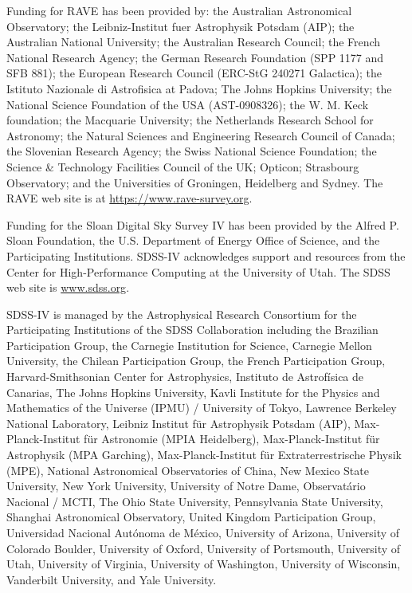 \documentclass[apj, twocolappendix, numberedappendix, appendixfloats]{emulateapj}
\begin{document}
Funding for RAVE has been provided by: the Australian Astronomical Observatory; the Leibniz-Institut fuer Astrophysik Potsdam (AIP); the Australian National University; the Australian Research Council; the French National Research Agency; the German Research Foundation (SPP 1177 and SFB 881); the European Research Council (ERC-StG 240271 Galactica); the Istituto Nazionale di Astrofisica at Padova; The Johns Hopkins University; the National Science Foundation of the USA (AST-0908326); the W. M. Keck foundation; the Macquarie University; the Netherlands Research School for Astronomy; the Natural Sciences and Engineering Research Council of Canada; the Slovenian Research Agency; the Swiss National Science Foundation; the Science \& Technology Facilities Council of the UK; Opticon; Strasbourg Observatory; and the Universities of Groningen, Heidelberg and Sydney.
The RAVE web site is at \url{https://www.rave-survey.org}.

Funding for the Sloan Digital Sky Survey IV has been provided by the Alfred P. Sloan Foundation, the U.S. Department of Energy Office of Science, and the Participating Institutions. SDSS-IV acknowledges support and resources from the Center for High-Performance Computing at the University of Utah. The SDSS web site is \url{www.sdss.org}.

SDSS-IV is managed by the Astrophysical Research Consortium for the Participating Institutions of the SDSS Collaboration including the Brazilian Participation Group, the Carnegie Institution for Science, Carnegie Mellon University, the Chilean Participation Group, the French Participation Group, Harvard-Smithsonian Center for Astrophysics, Instituto de Astrof\'isica de Canarias, The Johns Hopkins University, Kavli Institute for the Physics and Mathematics of the Universe (IPMU) / University of Tokyo, Lawrence Berkeley National Laboratory, Leibniz Institut f\"ur Astrophysik Potsdam (AIP),  Max-Planck-Institut f\"ur Astronomie (MPIA Heidelberg), Max-Planck-Institut f\"ur Astrophysik (MPA Garching), Max-Planck-Institut f\"ur Extraterrestrische Physik (MPE), National Astronomical Observatories of China, New Mexico State University, New York University, University of Notre Dame, Observat\'ario Nacional / MCTI, The Ohio State University, Pennsylvania State University, Shanghai Astronomical Observatory, United Kingdom Participation Group, Universidad Nacional Aut\'onoma de M\'exico, University of Arizona, University of Colorado Boulder, University of Oxford, University of Portsmouth, University of Utah, University of Virginia, University of Washington, University of Wisconsin, Vanderbilt University, and Yale University.
\end{document}
